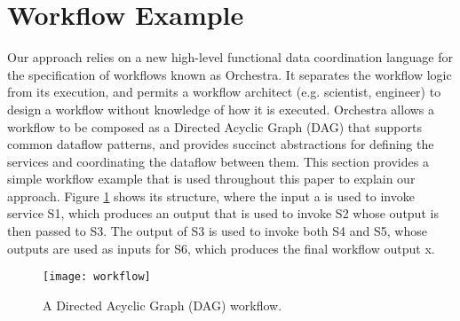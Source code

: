 \documentclass[10pt, conference, compsocconf]{IEEEtran}
\newenvironment{ppl}{\small\ttfamily}{}
\begin{document}
\section{Workflow Example}\label{workflowexamplesection}

Our approach relies on a new high-level functional data coordination language for the specification of workflows known as Orchestra.
It separates the workflow logic from its execution, and permits a workflow architect (e.g. scientist, engineer) to design a workflow without knowledge of how it is executed.
Orchestra allows a workflow to be composed as a Directed Acyclic Graph (DAG) that supports common dataflow patterns, and provides succinct abstractions for defining the services and coordinating the dataflow between them.
This section provides a simple workflow example that is used throughout this paper to explain our approach.
Figure \ref{workflowfigure} shows its structure, where the input \begin{ppl}a\end{ppl} is used to invoke service \begin{ppl}S1\end{ppl}, which produces an output that is used to invoke \begin{ppl}S2\end{ppl} whose output is then passed to \begin{ppl}S3\end{ppl}.
The output of \begin{ppl}S3\end{ppl} is used to invoke both \begin{ppl}S4\end{ppl} and \begin{ppl}S5\end{ppl}, whose outputs are used as inputs for \begin{ppl}S6\end{ppl}, which produces the final workflow output \begin{ppl}x\end{ppl}.

\begin{figure}[h]
\centerline{\texttt{[image: workflow]}}
\caption{A Directed Acyclic Graph (DAG) workflow.}
\label{workflowfigure}
\end{figure}
\end{document}
